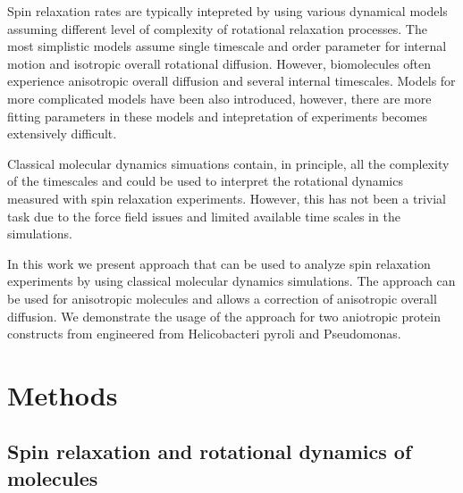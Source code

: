 \documentclass[pre,aps,floatfix,authordate1-4,twocolumn]{revtex4-1}
\begin{document}
Spin relaxation rates are typically intepreted by using various dynamical models
assuming different level of complexity of rotational relaxation processes.
The most simplistic models assume single timescale and order parameter for internal
motion and isotropic overall rotational diffusion. However, biomolecules often experience
anisotropic overall diffusion and several internal timescales. Models for more complicated
models have been also introduced, however, there are more fitting parameters in these models
and intepretation of experiments becomes extensively difficult.

Classical molecular dynamics simuations contain, in principle, all the complexity of the
timescales and could be used to interpret the rotational dynamics measured with spin
relaxation experiments. However, this has not been a trivial task due to the force field
issues and limited available time scales in the simulations.

In this work we present approach that can be used to analyze spin relaxation experiments
by using classical molecular dynamics simulations. The approach can be used for anisotropic
molecules and allows a correction of anisotropic overall diffusion. We demonstrate
the usage of the approach for two aniotropic protein constructs from engineered from
Helicobacteri pyroli and Pseudomonas.


\section{Methods}

\subsection{Spin relaxation and rotational dynamics of molecules}
\end{document}
